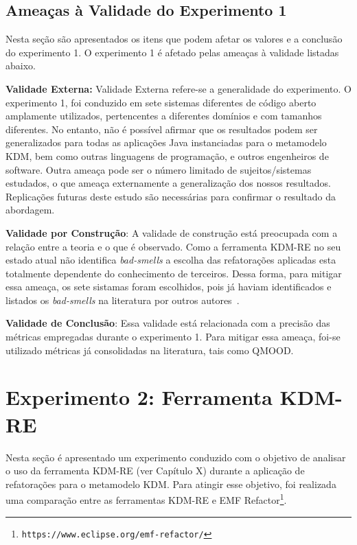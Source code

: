 \subsection{Ameaças à Validade do Experimento 1}

Nesta seção são apresentados os itens que podem afetar os valores e a conclusão do experimento 1. O experimento 1 é afetado pelas ameaças à validade listadas abaixo.

\textbf{Validade Externa:} Validade Externa refere-se a generalidade do experimento. O experimento 1, foi conduzido em sete sistemas diferentes de código aberto amplamente utilizados, pertencentes a diferentes domínios e com tamanhos diferentes. No entanto, não é possível afirmar que os resultados podem ser generalizados para todas as aplicações Java instanciadas para o metamodelo KDM, bem como outras linguagens de programação, e outros engenheiros de software. Outra ameaça pode ser o número limitado de sujeitos/sistemas estudados, o que ameaça externamente a generalização dos nossos resultados. Replicações futuras deste estudo são necessárias para confirmar o resultado da abordagem.


\textbf{Validade por Construção}: A validade de construção está preocupada com a relação entre a teoria e o que é observado. Como a ferramenta KDM-RE no seu estado atual não identifica \textit{bad-smells} a escolha das refatorações aplicadas esta totalmente dependente do conhecimento de terceiros. Dessa forma, para mitigar essa ameaça, os sete sistamas foram escolhidos, pois já haviam identificados e listados os \textit{bad-smells} na literatura por outros autores~\cite{Kessentini_2011, Ouni_2013, Moha_2010, Kessentini_2010}.

\textbf{Validade de Conclusão}: Essa validade está relacionada com a precisão das métricas empregadas durante o experimento 1. Para mitigar essa ameaça, foi-se utilizado métricas já consolidadas na literatura, tais como QMOOD. 


\section{Experimento 2: Ferramenta KDM-RE}\label{sec:experimento_KDM_re}

Nesta seção é apresentado um experimento conduzido com o objetivo de analisar o uso da ferramenta KDM-RE (ver Capítulo X) durante a aplicação de refatorações para o metamodelo KDM. Para atingir esse objetivo, foi realizada uma comparação entre as ferramentas KDM-RE e EMF Refactor\footnote{\texttt{https://www.eclipse.org/emf-refactor/}}.

